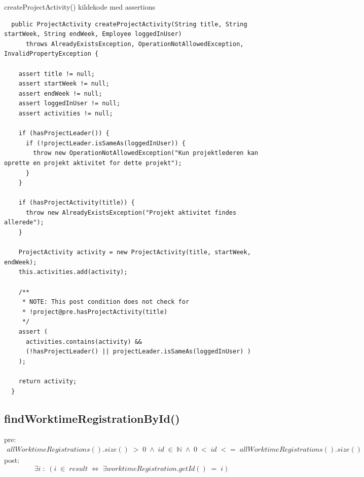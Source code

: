 \begin{listing}[H]
    \centering
    \caption{createProjectActivity() kildekode med assertions}\label{lst:create_project_activity_assertions}
    \begin{verbatim}
  public ProjectActivity createProjectActivity(String title, String startWeek, String endWeek, Employee loggedInUser)
      throws AlreadyExistsException, OperationNotAllowedException, InvalidPropertyException {

    assert title != null;
    assert startWeek != null;
    assert endWeek != null;
    assert loggedInUser != null;
    assert activities != null;

    if (hasProjectLeader()) {
      if (!projectLeader.isSameAs(loggedInUser)) {
        throw new OperationNotAllowedException("Kun projektlederen kan oprette en projekt aktivitet for dette projekt");
      }
    }

    if (hasProjectActivity(title)) {
      throw new AlreadyExistsException("Projekt aktivitet findes allerede");
    }

    ProjectActivity activity = new ProjectActivity(title, startWeek, endWeek);
    this.activities.add(activity);

    /**
     * NOTE: This post condition does not check for 
     * !project@pre.hasProjectActivity(title)
     */
    assert (
      activities.contains(activity) &&
      (!hasProjectLeader() || projectLeader.isSameAs(loggedInUser) )
    );

    return activity;
  }
    \end{verbatim}
\end{listing}


\subsection{findWorktimeRegistrationById()}
\noindent pre: 
\begin{align}
    allWorktimeRegistrations().size()\; >\; 0 \;\wedge\; id \; \in \; \mathbb{N} \; \wedge \; 0 \; < \; id  \; <=\; allWorktimeRegistrations().size()
\end{align}
post: 
\begin{equation}
    \exists i\; :\; (i\; \in\; result\; \iff\; \exists worktimeRegistration.getId() \; = \; i)
\end{equation}

